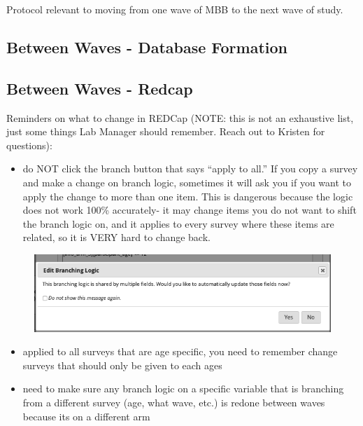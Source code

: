 \documentclass[
]{book}
\providecommand{\tightlist}{%
  \setlength{\itemsep}{0pt}\setlength{\parskip}{0pt}}
\begin{document}
Protocol relevant to moving from one wave of MBB to the next wave of study.

\hypertarget{between-waves---database-formation}{%
\subsection{Between Waves - Database Formation}\label{between-waves---database-formation}}

\hypertarget{between-waves---redcap}{%
\subsection{Between Waves - Redcap}\label{between-waves---redcap}}

Reminders on what to change in REDCap (NOTE: this is not an exhaustive list, just some things Lab Manager should remember. Reach out to Kristen for questions):

\begin{itemize}
\tightlist
\item
  do NOT click the branch button that says ``apply to all.'' If you copy a survey and make a change on branch logic, sometimes it will ask you if you want to apply the change to more than one item. This is dangerous because the logic does not work 100\% accurately- it may change items you do not want to shift the branch logic on, and it applies to every survey where these items are related, so it is VERY hard to change back.
\end{itemize}

\begin{figure}
\centering
\includegraphics{images/branch_logic/1.png}
\caption{}
\end{figure}

\begin{itemize}
\tightlist
\item
  applied to all surveys that are age specific, you need to remember change surveys that should only be given to each ages
\item
  need to make sure any branch logic on a specific variable that is branching from a different survey (age, what wave, etc.) is redone between waves because its on a different arm
\end{itemize}
\end{document}
